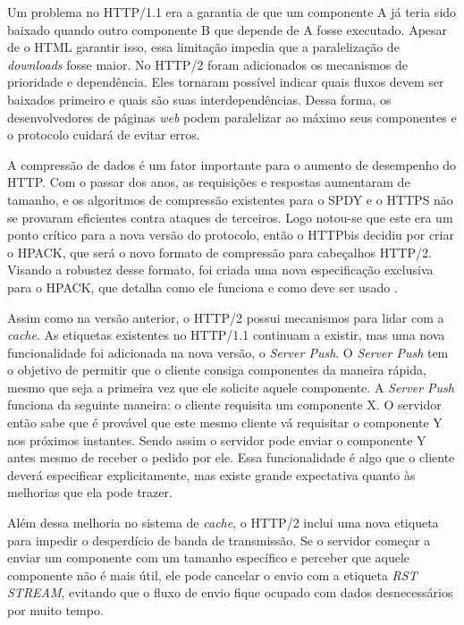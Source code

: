 Um problema no HTTP/1.1 era a garantia de que um componente A já teria sido baixado quando outro componente B que depende de A fosse executado. Apesar de o HTML garantir isso, essa limitação impedia que a paralelização de \textit{downloads} fosse maior. No HTTP/2 foram adicionados os mecanismos de prioridade e dependência. Eles tornaram possível indicar quais fluxos devem ser baixados primeiro e quais são suas interdependências. Dessa forma, os desenvolvedores de páginas \textit{web} podem paralelizar ao máximo seus componentes e o protocolo cuidará de evitar erros. 

A compressão de dados é um fator importante para o aumento de desempenho do HTTP. Com o passar dos anos, as requisições e respostas aumentaram de tamanho, e os algoritmos de compressão existentes para o SPDY e o HTTPS não se provaram eficientes contra ataques de terceiros. Logo notou-se que este era um ponto crítico para a nova versão do protocolo, então o HTTPbis decidiu por criar o HPACK, que será o novo formato de compressão para cabeçalhos HTTP/2. Visando a robustez desse formato, foi criada uma nova especificação exclusiva para o HPACK, que detalha como ele funciona e como deve ser usado \cite{HPACKSpec}.

Assim como na versão anterior, o HTTP/2 possui mecanismos para lidar com a \textit{cache}. As etiquetas existentes no HTTP/1.1 continuam a existir, mas uma nova funcionalidade foi adicionada na nova versão, o \textit{Server Push}. O \textit{Server Push} tem o objetivo de permitir que o cliente consiga componentes da maneira rápida, mesmo que seja a primeira vez que ele solicite aquele componente. A \textit{Server Push} funciona da seguinte maneira: o cliente requisita um componente X. O servidor então sabe que é provável que este mesmo cliente vá requisitar o componente Y nos próximos instantes. Sendo assim o servidor pode enviar o componente Y antes mesmo de receber o pedido por ele. Essa funcionalidade é algo que o cliente deverá especificar explicitamente, mas existe grande expectativa quanto às melhorias que ela pode trazer.

Além dessa melhoria no sistema de \textit{cache}, o HTTP/2 inclui uma nova etiqueta para impedir o desperdício de banda de transmissão. Se o servidor começar a enviar um componente com um tamanho específico e perceber que aquele componente não é mais útil, ele pode cancelar o envio com a etiqueta \textit{RST STREAM}, evitando que o fluxo de envio fique ocupado com dados desnecessários por muito tempo.

